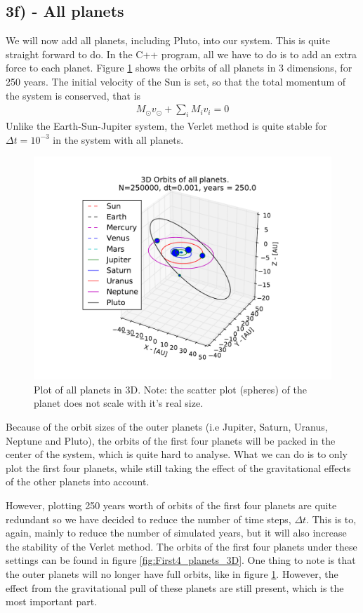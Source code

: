\documentclass[12pt]{article}
\begin{document}
\subsection*{3f) - All planets}
We will now add all planets, including Pluto, into our system. This is quite straight forward to do. In the C++ program, all we have to do is to add an extra force to each planet. Figure \ref{fig:All_planets_3D} shows the orbits of all planets in 3 dimensions, for 250 years. The initial velocity of the Sun is set, so that the total momentum of the system is conserved, that is
\begin{align}
M_{\odot}v_{\odot} + \displaystyle \sum_i M_i v_i = 0
\end{align}
Unlike the Earth-Sun-Jupiter system, the Verlet method is quite stable for $\Delta t = 10^{-3}$ in the system with all planets. 
\begin{figure}[!h]
\centering
\includegraphics[width=\linewidth]{Plots/All_planets_3D_plot.pdf}
\caption{Plot of all planets in 3D. Note: the scatter plot (spheres) of the planet does not scale with it's real size.}
\label{fig:All_planets_3D}
\end{figure}

Because of the orbit sizes of the outer planets (i.e Jupiter, Saturn, Uranus, Neptune and Pluto), the orbits of the first four planets will be packed in the center of the system, which is quite hard to analyse. What we can do is to only plot the first four planets, while still taking the effect of the gravitational effects of the other planets into account. 

However, plotting 250 years worth of orbits of the first four planets are quite redundant so we have decided to reduce the number of time steps, $\Delta t$. This is to, again, mainly to reduce the number of simulated years, but it will also increase the stability of the Verlet method. The orbits of the first four planets under these settings can be found in figure \ref{fig:First4_planets_3D}. One thing to note is that the outer planets will no longer have full orbits, like in figure \ref{fig:All_planets_3D}. However, the effect from the gravitational pull of these planets are still present, which is the most important part.
\end{document}
